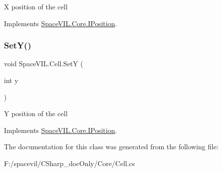 X position of the cell 



Implements \mbox{\hyperlink{interface_space_v_i_l_1_1_core_1_1_i_position}{Space\+V\+I\+L.\+Core.\+I\+Position}}.

\mbox{\label{class_space_v_i_l_1_1_cell_a1876cc8c7d5b4ad383df1fe2330366f8}} 
\subsubsection{\texorpdfstring{Set\+Y()}{SetY()}}
{\footnotesize\ttfamily void Space\+V\+I\+L.\+Cell.\+SetY (\begin{DoxyParamCaption}\item[{int}]{y }\end{DoxyParamCaption})}



Y position of the cell 



Implements \mbox{\hyperlink{interface_space_v_i_l_1_1_core_1_1_i_position}{Space\+V\+I\+L.\+Core.\+I\+Position}}.



The documentation for this class was generated from the following file\+:\begin{DoxyCompactItemize}
\item 
F\+:/spacevil/\+C\+Sharp\+\_\+doc\+Only/\+Core/Cell.\+cs\end{DoxyCompactItemize}

